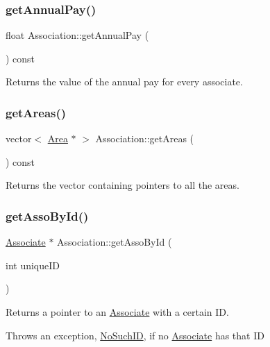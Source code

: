 \subsubsection{\texorpdfstring{get\+Annual\+Pay()}{getAnnualPay()}}
{\footnotesize\ttfamily float Association\+::get\+Annual\+Pay (\begin{DoxyParamCaption}{ }\end{DoxyParamCaption}) const}



Returns the value of the annual pay for every associate. 

\mbox{\label{classAssociation_a46f83e00e0201f25129a5c8167969661}} 
\subsubsection{\texorpdfstring{get\+Areas()}{getAreas()}}
{\footnotesize\ttfamily vector$<$ \hyperlink{classArea}{Area} $\ast$ $>$ Association\+::get\+Areas (\begin{DoxyParamCaption}{ }\end{DoxyParamCaption}) const}



Returns the vector containing pointers to all the areas. 

\mbox{\label{classAssociation_a0c9670f1508da038f12e4ed11042189e}} 
\subsubsection{\texorpdfstring{get\+Asso\+By\+Id()}{getAssoById()}}
{\footnotesize\ttfamily \hyperlink{classAssociate}{Associate} $\ast$ Association\+::get\+Asso\+By\+Id (\begin{DoxyParamCaption}\item[{int}]{unique\+ID }\end{DoxyParamCaption})}



Returns a pointer to an \hyperlink{classAssociate}{Associate} with a certain ID. 

Throws an exception, \hyperlink{classNoSuchID}{No\+Such\+ID}, if no \hyperlink{classAssociate}{Associate} has that ID


